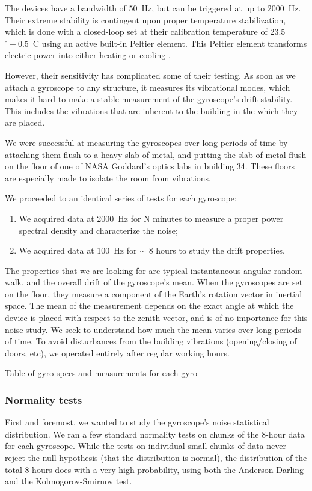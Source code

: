 The devices have a bandwidth of 50~Hz, but can be triggered at up to 2000~Hz. Their extreme stability is contingent upon proper temperature stabilization, which is done with a closed-loop set at their calibration temperature of 23.5$^{\circ}\pm 0.5$~C using an active built-in Peltier element. This Peltier element transforms electric power into either heating or cooling \citep{Peltier:1834vu}.

However, their sensitivity has complicated some of their testing. As soon as we attach a gyroscope to any structure, it measures its vibrational modes, which makes it hard to make a stable measurement of the gyroscope's drift stability. This includes the vibrations that are inherent to the building in the which they are placed.

We were successful at measuring the gyroscopes over long periods of time by attaching them flush to a heavy slab of metal, and putting the slab of metal flush on the floor of one of NASA Goddard's optics labs in building 34. These floors are especially made to isolate the room from vibrations.

We proceeded to an identical series of tests for each gyroscope:
\begin{enumerate}
\item We acquired data at 2000~Hz for N minutes to measure a proper power spectral density and characterize the noise;
\item We acquired data at 100~Hz for $\sim$ 8 hours to study the drift properties.
\end{enumerate}

The properties that we are looking for are typical instantaneous angular random walk, and the overall drift of the gyroscope's mean. When the gyroscopes are set on the floor, they measure a component of the Earth's rotation vector in inertial space. The mean of the measurement depends on the exact angle at which the device is placed with respect to the zenith vector, and is of no importance for this noise study. We seek to understand how much the mean varies over long periods of time. To avoid disturbances from the building vibrations (opening/closing of doors, etc), we operated entirely after regular working hours.

Table of gyro specs and measurements for each gyro

\subsubsection{Normality tests}
First and foremost, we wanted to study the gyroscope's noise statistical distribution. We ran a few standard normality tests on chunks of the 8-hour data for each gyroscope. While the tests on individual small chunks of data never reject the null hypothesis (that the distribution is normal), the distribution of the total 8 hours does with a very high probability, using both the Anderson-Darling and the Kolmogorov-Smirnov test.


